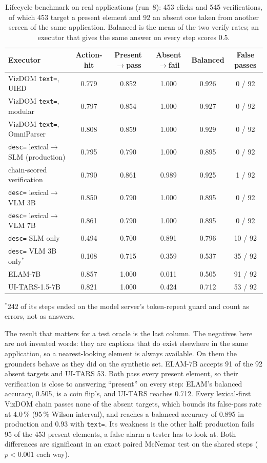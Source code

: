 \documentclass[11pt,a4paper]{article}
\newcommand{\code}[1]{\texttt{#1}}
\begin{document}
\begin{table}[htbp]
\centering
\caption{Lifecycle benchmark on real applications (run~8): 453 clicks and 545
verifications, of which 453 target a present element and 92 an absent one taken from
another screen of the same application. Balanced is the mean of the two verify rates;
an executor that gives the same answer on every step scores 0.5.}
\label{tab:lifecycle-realworld}
\small
\begin{tabular}{@{}lccccc@{}}
\toprule
Executor & Action-hit & Present$\rightarrow$pass & Absent$\rightarrow$fail & Balanced & False passes \\
\midrule
VizDOM \code{text=}, UIED & 0.779 & 0.852 & 1.000 & 0.926 & 0 / 92 \\
VizDOM \code{text=}, modular & 0.797 & 0.854 & 1.000 & 0.927 & 0 / 92 \\
VizDOM \code{text=}, OmniParser & 0.808 & 0.859 & 1.000 & 0.929 & 0 / 92 \\
\code{desc=} lexical$\rightarrow$SLM (production) & 0.795 & 0.790 & 1.000 & 0.895 & 0 / 92 \\
\quad chain-scored verification & 0.790 & 0.861 & 0.989 & 0.925 & 1 / 92 \\
\code{desc=} lexical$\rightarrow$VLM 3B & 0.850 & 0.790 & 1.000 & 0.895 & 0 / 92 \\
\code{desc=} lexical$\rightarrow$VLM 7B & 0.861 & 0.790 & 1.000 & 0.895 & 0 / 92 \\
\code{desc=} SLM only & 0.494 & 0.700 & 0.891 & 0.796 & 10 / 92 \\
\code{desc=} VLM 3B only$^\ast$ & 0.108 & 0.715 & 0.359 & 0.537 & 35 / 92 \\
ELAM-7B & 0.857 & 1.000 & 0.011 & 0.505 & 91 / 92 \\
UI-TARS-1.5-7B & 0.821 & 1.000 & 0.424 & 0.712 & 53 / 92 \\
\bottomrule
\end{tabular}

\smallskip
\footnotesize $^\ast$242 of its steps ended on the model server's token-repeat guard
and count as errors, not as answers.
\end{table}

The result that matters for a test oracle is the last column. The negatives here are
not invented words: they are captions that do exist elsewhere in the same application,
so a nearest-looking element is always available. On them the grounders behave as they
did on the synthetic set. ELAM-7B accepts 91 of the 92 absent targets and UI-TARS 53.
Both pass every present element, so their verification is close to answering
``present'' on every step: ELAM's balanced accuracy, 0.505, is a coin flip's, and
UI-TARS reaches 0.712. Every lexical-first VizDOM chain passes none of the absent
targets, which bounds its false-pass rate at 4.0\,\% (95\,\% Wilson interval), and
reaches a balanced accuracy of 0.895 in production and 0.93 with \code{text=}. Its
weakness is the other half: production fails 95 of the 453 present elements, a false
alarm a tester has to look at. Both differences are significant in an exact paired
McNemar test on the shared steps ($p<0.001$ each way).
\end{document}
